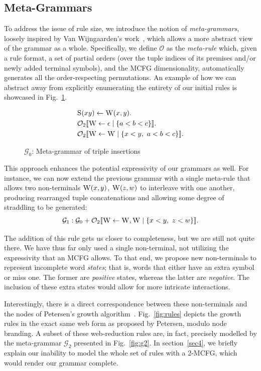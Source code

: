 \documentclass{llncs}
\newcommand\s{\textsc}
\newcommand{\Orderr}[5]{
	\mathcal{#1}_{#5}\llbracket #2 \leftarrow #3 \mid \{ #4 \} \rrbracket.
}
\newcommand{\Or}[4]{\Orderr{O}{#1}{#2}{#3}{#4}}
\begin{document}
\subsection{Meta-Grammars}\label{subsec22}
To address the issue of rule size, we introduce the notion of \textit{meta-grammars}, loosely inspired by Van Wijngaarden's work~\cite{vanwijn}, which allows a more abstract view of the grammar as a whole. Specifically, we define $\mathcal{O}$ as the \textit{meta-rule} which, given a rule format, a set of partial orders (over the tuple indices of its premises and/or newly added terminal symbols), and the MCFG dimensionality, automatically generates all the order-respecting permutations. An example of how we can abstract away from explicitly enumerating the entirety of our initial rules is showcased in Fig.~\ref{fig:meta-ins}.

\begin{figure}
  \centering
  \begin{align*}
	&\s{S}(xy) \leftarrow \s{W}(x,y). \\
	&\Or{\s{W}}{\epsilon}{a < b < c}{2} \\
	&\Or{\s{W}}{\s{W}}{x < y,\ a < b < c}{2}
	\end{align*}
  \caption{$\mathcal{G}_0$: Meta-grammar of triple insertions}  
	\label{fig:meta-ins}
\end{figure}

This approach enhances the potential expressivity of our grammars as well. For instance, we can now extend the previous grammar with a single meta-rule that allows two non-terminals $\s{W}(x,y)$, $\s{W}(z,w)$ to interleave with one another, producing rearranged tuple concatenations and allowing some degree of straddling to be generated:
\[
\mathcal{G}_1: \mathcal{G}_0 + \Or{\s{W}}{\s{W}, \s{W}}{x < y,\ z < w}{2}
\]

The addition of this rule gets us closer to completeness, but we are still not quite there. We have thus far only used a single non-terminal, not utilizing the expressivity that an MCFG allows. To that end, we propose new non-terminals to represent incomplete word \textit{states}; that is, words that either have an extra symbol or miss one. The former are \textit{positive} states, whereas the latter are \textit{negative}. The inclusion of these extra states would allow for more intricate interactions.

Interestingly, there is a direct correspondence between these non-terminals and the nodes of Petersen's growth algorithm~\cite{petersen}. Fig.~\ref{fig:rules} depicts the growth rules in the exact same web form as proposed by Petersen, modulo node branding. A subset of these web-reduction rules are, in fact, precisely modelled by the meta-grammar $\mathcal{G}_2$ presented in Fig.~\ref{fig:g2}. In section~\ref{sec4}, we briefly explain our inability to model the whole set of rules with a 2-MCFG, which would render our grammar complete.
\end{document}
